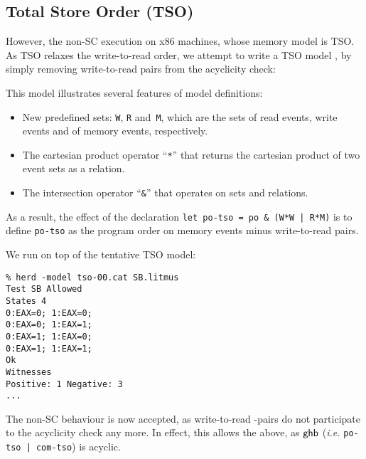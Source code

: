 \subsection{Total Store Order (TSO)}
However, the non-SC execution  on x86 machines,
whose memory model is TSO. As TSO relaxes the write-to-read order, we attempt
to write a TSO model , by simply removing write-to-read
pairs from the acyclicity check:

This model illustrates several features
of model definitions:
\begin{itemize}
\item New predefined sets: \verb+W+, \verb+R+ and~\verb+M+, which are
the sets of read events, write events and of memory events, respectively.
\item The cartesian product operator ``\verb+*+'' that returns the cartesian
product of two event sets as a relation.
\item The intersection operator ``\verb+&+'' that operates on sets and
relations.
\end{itemize}
As a result, the effect of the declaration
\verb+let po-tso = po & (W*W | R*M)+ is to define \verb+po-tso+
as the program order on memory events minus write-to-read pairs.

We run  on top of the tentative TSO model:
\begin{verbatim}
% herd -model tso-00.cat SB.litmus 
Test SB Allowed
States 4
0:EAX=0; 1:EAX=0;
0:EAX=0; 1:EAX=1;
0:EAX=1; 1:EAX=0;
0:EAX=1; 1:EAX=1;
Ok
Witnesses
Positive: 1 Negative: 3
...
\end{verbatim}
\label{sb:image}The non-SC behaviour is now accepted, as write-to-read -pairs
do not participate to the acyclicity check any more. In effect, this allows
the  above,
as $\textsf{ghb}$ (\emph{i.e.}
\verb+po-tso | com-tso+) is acyclic.
\begin{center}\end{center}


